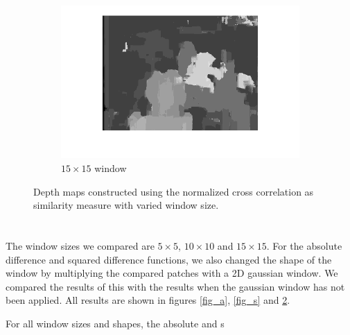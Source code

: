 \documentclass{article}
\begin{document}
\begin{figure}[ht!]
\begin{subfigure}{.3\textwidth}
  \centering
  \includegraphics[width=1\linewidth]{ex3/x15_15.png}
  \caption{$15\times15$ window}
  \label{fig_x3g}
 \end{subfigure}
 \caption{Depth maps constructed using the normalized cross correlation as similarity measure with varied window size.}
 \label{fig_x}
\end{figure}



\section{}
The window sizes we compared are $5\times5$, $10\times10$ and $15\times15$. For the absolute difference and squared difference functions, we also changed the shape of the window by multiplying the compared patches with a 2D gaussian window. We compared the results of this with the results when the gaussian window has not been applied. All results are shown in figures \ref{fig_a}, \ref{fig_s} and \ref{fig_x}.

For all window sizes and shapes, the absolute and s
\end{document}
